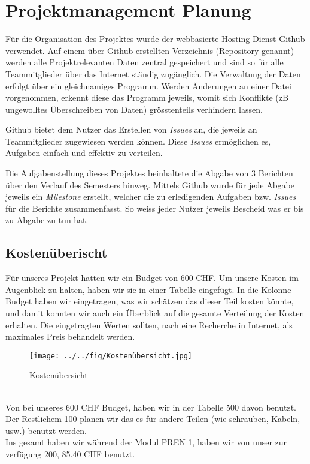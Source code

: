 \section{Projektmanagement Planung}
Für die Organisation des Projektes wurde der webbasierte Hosting-Dienst Github verwendet. Auf einem über Github erstellten Verzeichnis (Repository genannt) werden alle Projektrelevanten Daten zentral gespeichert und sind so für alle Teammitglieder über das Internet ständig zugänglich. Die Verwaltung der Daten erfolgt über ein gleichnamiges Programm. Werden Änderungen an einer Datei vorgenommen, erkennt diese das Programm jeweils, womit sich Konflikte (zB ungewolltes Überschreiben von Daten) grösstenteils verhindern lassen.

Github bietet dem Nutzer das Erstellen von \emph{Issues} an, die jeweils an Teammitglieder zugewiesen werden können. Diese \emph{Issues} ermöglichen es, Aufgaben einfach und effektiv zu verteilen.

Die Aufgabenstellung dieses Projektes beinhaltete die Abgabe von 3 Berichten über den Verlauf des Semesters hinweg. Mittels Github wurde für jede Abgabe jeweils ein \emph{Milestone} erstellt, welcher die zu erledigenden Aufgaben bzw. \emph{Issues} für die Berichte zusammenfasst. So weiss jeder Nutzer jeweils Bescheid was er bis zu Abgabe zu tun hat. \\

\subsection{Kostenüberischt}
Für unseres Projekt hatten wir ein Budget von 600 CHF. Um unsere Kosten im Augenblick zu halten, haben wir sie in einer Tabelle eingefügt. In die Kolonne Budget haben wir eingetragen, was wir schätzen das dieser Teil kosten könnte, und damit konnten wir auch ein Überblick auf die gesamte Verteilung der Kosten erhalten. Die eingetragten Werten sollten, nach eine Recherche in Internet, als maximales Preis behandelt werden.\\
\begin{figure}[h!]
	\center
	\texttt{[image: ../../fig/Kostenübersicht.jpg]}
	\caption{Kostenübersicht}
	\label{fig:Kostenübersicht}
\end{figure}\\
Von bei unseres 600 CHF Budget, haben wir in der Tabelle 500 davon benutzt. Der Restlichem 100 planen wir das es für andere Teilen (wie schrauben, Kabeln, usw.) benutzt werden. \\
Ins gesamt haben wir während der Modul PREN 1, haben wir von unser zur verfügung 200, 85.40 CHF benutzt. 







